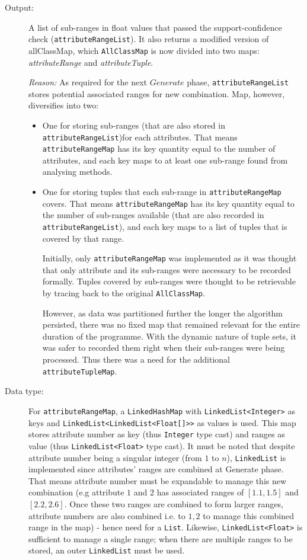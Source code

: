 \begin{description}
\item[Output: ] A list of sub-ranges in float values that passed the support-confidence check (\texttt{attributeRangeList}). It also returns a modified version of allClassMap, which \texttt{AllClassMap} is now divided into two maps: \textit{attributeRange} and \textit{attributeTuple}.
  
\textit{Reason: } As required for the next $Generate$ phase, \texttt{attributeRangeList} stores potential associated ranges for new combination. 
Map, however, diversifies into two: 
\begin{itemize}
	\item One for storing sub-ranges (that are also stored in \texttt{attributeRangeList})for each attributes. That means \texttt{attributeRangeMap} has its key quantity equal to the number of attributes, and each key maps to at least one sub-range found from analysing methods.
	
	\item One for storing tuples that each sub-range in \texttt{attributeRangeMap} covers. That means \texttt{attributeRangeMap} has its key quantity equal to the number of sub-ranges available (that are also recorded in \texttt{attributeRangeList}), and each key maps to a list of tuples that is covered by that range.
	
Initially, only \texttt{attributeRangeMap} was implemented as it was thought that only attribute and its sub-ranges were necessary to be recorded formally. Tuples covered by sub-ranges were thought to be retrievable by tracing back to the original \texttt{AllClassMap}.
	
However, as data was partitioned further the longer the algorithm persisted, there was no fixed map that remained relevant for the entire duration of the programme. With the dynamic nature of tuple sets, it was safer to recorded them right when their sub-ranges were being processed. Thus there was a need for the additional \texttt{attributeTupleMap}.
\end{itemize}

\item[Data type: ] For \texttt{attributeRangeMap}, a \texttt{LinkedHashMap} with \texttt{LinkedList<Integer>} as keys and \texttt{LinkedList<LinkedList<Float[]>>} as values is used. This map stores attribute number as key (thus \texttt{Integer} type cast) and ranges as value (thus \texttt{LinkedList<Float>} type cast). It must be noted that despite attribute number being a singular integer (from $1$ to $n$), \texttt{LinkedList} is implemented since attributes' ranges are combined at Generate phase. That means attribute number must be expandable to manage this new combination (e.g attribute $1$ and $2$ has associated ranges of $[1.1,1.5]$ and $[2.2, 2.6]$. Once these two ranges are combined to form larger ranges, attribute numbers are also combined i.e. to ${1,2}$ to manage this combined range in the map) - hence need for a \texttt{List}. Likewise, \texttt{LinkedList<Float>} is sufficient to manage a single range; when there are multiple ranges to be stored, an outer \texttt{LinkedList} must be used.


\end{description}
